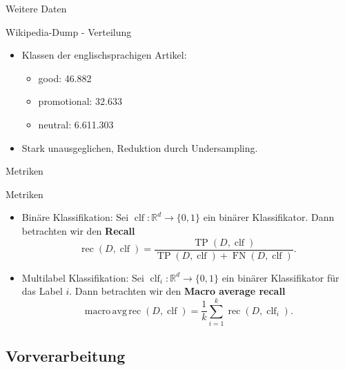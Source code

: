 \documentclass[aspectratio=169]{beamer} %
\newcommand{\clf}{\operatorname{clf}}
\newcommand{\rec}{\operatorname{rec}}
\newcommand{\tp}{\operatorname{TP}}
\newcommand{\fn}{\operatorname{FN}}
\begin{document}
\begin{frame}{Weitere Daten}
    \begin{block}{Wikipedia-Dump - Verteilung}
        \begin{itemize}
            \item Klassen der englischsprachigen Artikel:
                  \begin{itemize}
                      \item good: 46.882
                      \item promotional: 32.633
                      \item neutral: 6.611.303
                  \end{itemize}
            \item Stark unausgeglichen, Reduktion durch Undersampling.
        \end{itemize}
    \end{block}
\end{frame}

\begin{frame}{Metriken}
    \begin{block}{Metriken}
        \begin{itemize}
            \item Binäre Klassifikation: Sei $\clf\colon \mathbb{R}^d\to \{0, 1\}$ ein binärer Klassifikator. Dann betrachten wir den \textbf{Recall}
                  \begin{equation*}
                      \rec(D, \clf) = \frac{\tp(D, \clf)}{\tp(D, \clf) + \fn(D, \clf)}.
                  \end{equation*}

            \item Multilabel Klassifikation: Sei $\clf_i\colon\mathbb{R}^d\to\{0, 1\}$ ein binärer Klassifikator für das Label $i$. Dann betrachten wir den \textbf{Macro average recall}
                  \begin{equation*}
                      \operatorname{macro\,avg\,rec}(D, \clf) = \frac{1}{k}\sum_{i=1}^k\rec (D, \clf_i).
                  \end{equation*}
        \end{itemize}
    \end{block}
\end{frame}

\subsection{Vorverarbeitung}
\end{document}
